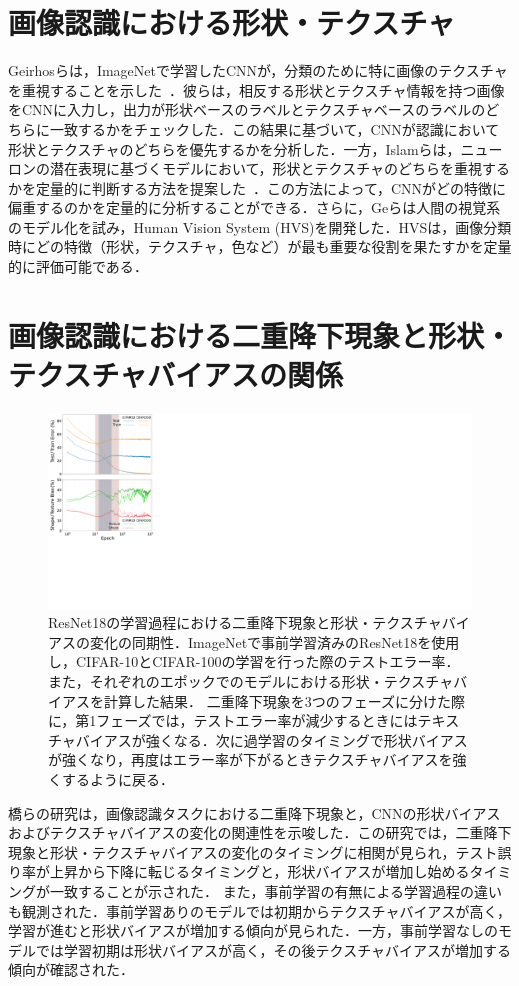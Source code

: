 \section{画像認識における形状・テクスチャ}
Geirhosらは，ImageNetで学習したCNNが，分類のために特に画像のテクスチャを重視することを示した~\cite{Geirhos}．彼らは，相反する形状とテクスチャ情報を持つ画像をCNNに入力し，出力が形状ベースのラベルとテクスチャベースのラベルのどちらに一致するかをチェックした．この結果に基づいて，CNNが認識において形状とテクスチャのどちらを優先するかを分析した．一方，Islamらは，ニューロンの潜在表現に基づくモデルにおいて，形状とテクスチャのどちらを重視するかを定量的に判断する方法を提案した~\cite{Islam}．この方法によって，CNNがどの特徴に偏重するのかを定量的に分析することができる．さらに，Geらは人間の視覚系のモデル化を試み，Human Vision System (HVS)を開発した．HVSは，画像分類時にどの特徴（形状，テクスチャ，色など）が最も重要な役割を果たすかを定量的に評価可能である\cite{Ge}．

\section{画像認識における二重降下現象と形状・テクスチャバイアスの関係}

\begin{figure}[t]
    \centering
    \includegraphics[width=\linewidth]{fig/iwaseICPR.pdf}
    \caption[ResNet18の学習過程における二重降下現象と形状・テクスチャバイアスの変化の同期性．]{ResNet18の学習過程における二重降下現象と形状・テクスチャバイアスの変化の同期性．ImageNetで事前学習済みのResNet18を使用し，CIFAR-10とCIFAR-100の学習を行った際のテストエラー率．また，それぞれのエポックでのモデルにおける形状・テクスチャバイアスを計算した結果．
    二重降下現象を3つのフェーズに分けた際に，第1フェーズでは，テストエラー率が減少するときにはテキスチャバイアスが強くなる．次に過学習のタイミングで形状バイアスが強くなり，再度はエラー率が下がるときテクスチャバイアスを強くするように戻る．}
    \label{fig:iwaseICPR}
\end{figure}
橋らの研究\cite{DD_STB}は，画像認識タスクにおける二重降下現象と，CNNの形状バイアスおよびテクスチャバイアスの変化の関連性を示唆した．この研究では，二重降下現象と形状・テクスチャバイアスの変化のタイミングに相関が見られ，テスト誤り率が上昇から下降に転じるタイミングと，形状バイアスが増加し始めるタイミングが一致することが示された．
また，事前学習の有無による学習過程の違いも観測された．事前学習ありのモデルでは初期からテクスチャバイアスが高く，学習が進むと形状バイアスが増加する傾向が見られた．一方，事前学習なしのモデルでは学習初期は形状バイアスが高く，その後テクスチャバイアスが増加する傾向が確認された．

